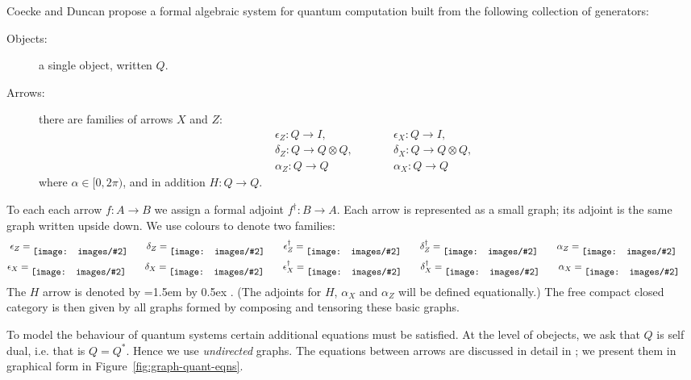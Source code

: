 \documentclass[runningheads]{llncs}
\newcommand{\inlinegraphic}[2]{
  \dimendef\grafheight=255\dimendef\grafvshift=254
  \grafheight=#1
  \grafvshift=-0.5\grafheight
  \advance\grafvshift by 0.5ex
  \raisebox{\grafvshift}{\texttt{[image: images/\#2]}\xspace}
}
\begin{document}
Coecke and Duncan \cite{Coecke:2008jo} propose a formal algebraic
system for quantum computation built from the following collection of
generators:  
\begin{description}
\item[Objects:] a single object, written $Q$.
\item[Arrows:] there are families of arrows $X$ and $Z$:
  \begin{align*}
  &\epsilon_Z : Q \to I, &\qquad&  \epsilon_X : Q \to I,\\
  &\delta_Z : Q \to Q \otimes Q, && \delta_X : Q \to Q \otimes Q, \\
  &\alpha_Z : Q \to Q &&  \alpha_X : Q \to Q   
  \end{align*}
  where $\alpha \in [0,2\pi)$, and in addition $H:Q\to Q$.
\end{description}
To each each arrow $f : A\to B$ we assign a formal adjoint $f^\dag : B
\to A$.  Each arrow is represented as a small graph; its adjoint is
the same graph written upside down.  We use colours to denote two families:
\begin{gather*}
  \epsilon_Z = \inlinegraphic{1.5em}{epsilon} \qquad
  \delta_Z = \inlinegraphic{1.5em}{delta} \qquad
  \epsilon_Z^\dag = \inlinegraphic{1.5em}{epsilondag} \qquad
  \delta_Z^\dag = \inlinegraphic{1.5em}{deltadag} \qquad
  \alpha_Z = \inlinegraphic{1.5em}{greenalpha} \qquad
\\  
  \epsilon_X = \inlinegraphic{1.5em}{redepsilon} \qquad
  \delta_X = \inlinegraphic{1.5em}{reddelta} \qquad
  \epsilon_X^\dag = \inlinegraphic{1.5em}{redepsilondag} \qquad
  \delta_X^\dag = \inlinegraphic{1.5em}{reddeltadag} \qquad
  \alpha_X = \inlinegraphic{1.5em}{redalpha} \qquad
\end{gather*}
The $H$ arrow is denoted by \inlinegraphic{1.5em}{H}.  (The adjoints
for $H$, $\alpha_X$ and $\alpha_Z$ will be defined equationally.)  The
free compact closed category is then given by all graphs formed by
composing and tensoring these basic graphs.  

To model the behaviour of quantum systems certain additional equations
must be satisfied.  At the  level of obejects, we ask that  $Q$ is
self dual, i.e. that is $Q = Q^*$.  Hence we use \emph{undirected}
graphs.  The equations between arrows are discussed in detail in
\cite{Coecke:2008jo};  we present them in graphical form in
Figure~\ref{fig:graph-quant-eqns}.
\end{document}
